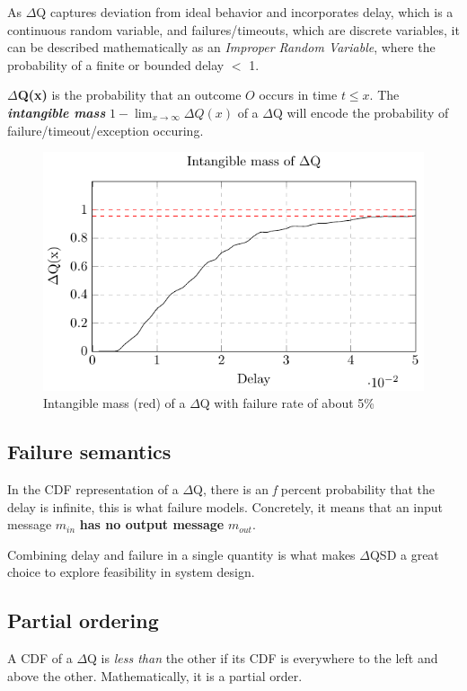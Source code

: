     As $\Delta$Q captures deviation from ideal behavior and incorporates delay, which is a continuous random variable, and failures/timeouts, which are discrete variables, it can be described mathematically as an \textit{Improper Random Variable}, where the probability of a finite or bounded delay $<$ 1. 

    \textbf{$\Delta$Q(x)} is the probability that an outcome $O$ occurs in time $t \le x$. The \textbf{\textit{intangible mass}} $1 - \lim_{x\to\infty}\Delta Q(x)$ of a $\Delta$Q will encode the probability of failure/timeout/exception occuring. \cite{myo}
    
    \begin{figure}[H]
        \begin{center}
            \includegraphics{tikz/intangible.pdf}
        \end{center}
        \caption{Intangible mass (red) of a $\Delta$Q with failure rate of about 5\% }
    \end{figure}
   
  \subsection{Failure semantics}
       In the CDF representation of a $\Delta$Q, there is an \textit{f} percent probability that the delay is infinite, this is what failure models. 
        Concretely, it means that an input message $m_{in}$ \textbf{has no output message} $m_{out}$. \cite{art}

        Combining delay and failure in a single quantity is what makes $\Delta$QSD a great choice to explore feasibility in system design. \cite{dq-tut}
   
    \subsection{Partial ordering}
        A CDF of a $\Delta$Q is \textit{less than} the other if its CDF is everywhere to the left and above the other. Mathematically, it is a partial order. 
        
